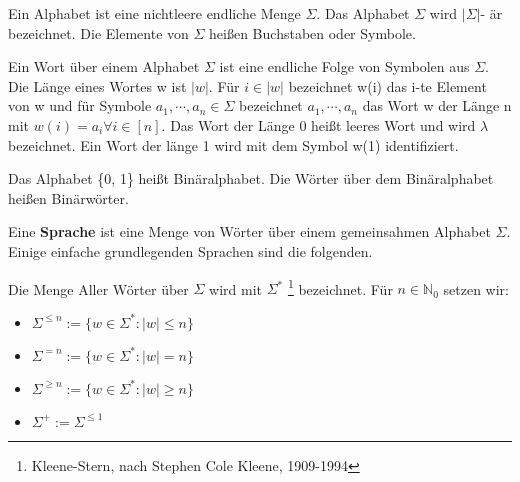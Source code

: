     Ein Alphabet ist eine nichtleere endliche Menge \(\Sigma\). Das Alphabet \(\Sigma\) wird \(\lvert \Sigma \rvert\)- är bezeichnet. Die Elemente von \(\Sigma\) heißen Buchstaben oder Symbole.

    Ein Wort über einem Alphabet \(\Sigma\) ist eine endliche Folge von Symbolen aus \(\Sigma\). Die Länge eines Wortes w ist \(\lvert w \rvert\). Für \(i \in\lvert w \rvert\) bezeichnet w(i) das i-te Element von w und für Symbole \(a_{1}, \cdots, a_{n} \in \Sigma\) bezeichnet \(a_{1}, \cdots, a_{n}\) das Wort w der Länge n mit \(w(i) = a_{i} \forall i\in [n]\). Das Wort der Länge 0 heißt leeres Wort und wird \(\lambda\) bezeichnet. Ein Wort der länge 1 wird mit dem Symbol w(1) identifiziert.

    Das Alphabet \{0, 1\} heißt Binäralphabet. Die Wörter über dem Binäralphabet heißen Binärwörter.

    Eine \textbf{Sprache} ist eine Menge von Wörter über einem gemeinsahmen Alphabet \(\Sigma\). Einige einfache grundlegenden Sprachen sind die folgenden.

    Die Menge Aller Wörter über \(\Sigma\) wird mit \(\Sigma^{*}\) \footnote{Kleene-Stern, nach Stephen Cole Kleene, 1909-1994}
    bezeichnet. Für \(n \in \mathbb{N}_{0}\) setzen wir:
    \begin{itemize}
        \item[] \(\Sigma^{\leq n} := \{w \in \Sigma^{*} : \lvert w \rvert \leq n\}\)
        \item[] \(\Sigma^{=n} := \{w \in \Sigma^{*} : \lvert w \rvert = n\}\)
        \item[] \(\Sigma^{\geq n} := \{w \in \Sigma^{*} : \lvert w \rvert \geq n\}\)
        \item[] \(\Sigma^{+} := \Sigma^{\leq 1}\)
    \end{itemize}

